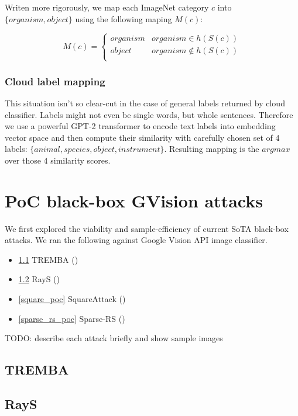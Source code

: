Writen more rigorously, we map each ImageNet category $c$ into $\{organism, object\}$ using the following maping $M(c)$:

\[ M(c) = \begin{cases} 
      organism & organism \in h(S(c)) \\
      object & organism \notin h(S(c)) \\
   \end{cases}
\]


\subsubsection{Cloud label mapping}
This situation isn't so clear-cut in the case of general labels returned by cloud classifier. Labels might not even be single words, but whole sentences. Therefore we use a powerful GPT-2 transformer to encode text labels into embedding vector space and then compute their similarity with carefully chosen set of 4 labels: $\{animal, species, object, instrument\}$. Resulting mapping is the $argmax$ over those 4 similarity scores.


\section{PoC black-box GVision attacks}
\label{poc_gvision_attacks}
We first explored the viability and sample-efficiency of current SoTA black-box attacks. We ran the following against Google Vision API image classifier.

\begin{itemize}
    \item \ref{tremba_poc} TREMBA (\cite{Huang2020BlackBoxAA})
    \item \ref{rays_poc} RayS (\cite{Chen2020RaySAR})
    \item \ref{square_poc} SquareAttack (\cite{Andriushchenko2020SquareAA})
    \item \ref{sparse_rs_poc} Sparse-RS (\cite{Croce2020SparseRSAV})
\end{itemize}

TODO: describe each attack briefly and show sample images

\subsection{TREMBA}
\label{tremba_poc}
\subsection{RayS}
\label{rays_poc}
